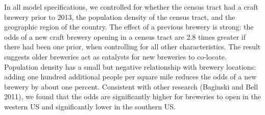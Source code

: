 \documentclass[]{article}
\begin{document}
In all model specifications, we controlled for whether the census tract
had a craft brewery prior to 2013, the population density of the census
tract, and the geographic region of the country. The effect of a
previous brewery is strong: the odds of a new craft brewery opening in a
census tract are 2.8 times greater if there had been one prior, when
controlling for all other characteristics. The result suggests older
breweries act as catalysts for new breweries to co-locate. Population
density has a small but negative relationship with brewery locations:
adding one hundred additional people per square mile reduces the odds of
a new brewery by about one percent. Consistent with other research
(Baginski and Bell 2011), we found that the odds are significantly
higher for breweries to open in the western US and significantly lower
in the southern US.
\end{document}
